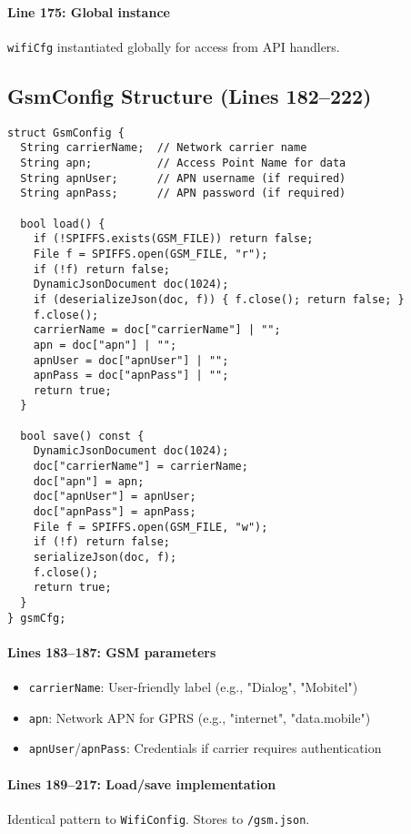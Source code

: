 \documentclass[11pt,a4paper]{article}
\begin{document}
\paragraph{Line 175: Global instance}
\texttt{wifiCfg} instantiated globally for access from API handlers.

\subsection{GsmConfig Structure (Lines 182--222)}

\begin{verbatim}
struct GsmConfig {
  String carrierName;  // Network carrier name
  String apn;          // Access Point Name for data
  String apnUser;      // APN username (if required)
  String apnPass;      // APN password (if required)

  bool load() {
    if (!SPIFFS.exists(GSM_FILE)) return false;
    File f = SPIFFS.open(GSM_FILE, "r");
    if (!f) return false;
    DynamicJsonDocument doc(1024);
    if (deserializeJson(doc, f)) { f.close(); return false; }
    f.close();
    carrierName = doc["carrierName"] | "";
    apn = doc["apn"] | "";
    apnUser = doc["apnUser"] | "";
    apnPass = doc["apnPass"] | "";
    return true;
  }

  bool save() const {
    DynamicJsonDocument doc(1024);
    doc["carrierName"] = carrierName;
    doc["apn"] = apn;
    doc["apnUser"] = apnUser;
    doc["apnPass"] = apnPass;
    File f = SPIFFS.open(GSM_FILE, "w");
    if (!f) return false;
    serializeJson(doc, f);
    f.close();
    return true;
  }
} gsmCfg;
\end{verbatim}

\paragraph{Lines 183--187: GSM parameters}
\begin{itemize}[leftmargin=*]
  \item \texttt{carrierName}: User-friendly label (e.g., "Dialog", "Mobitel")
  \item \texttt{apn}: Network APN for GPRS (e.g., "internet", "data.mobile")
  \item \texttt{apnUser}/\texttt{apnPass}: Credentials if carrier requires authentication
\end{itemize}

\paragraph{Lines 189--217: Load/save implementation}
Identical pattern to \texttt{WifiConfig}. Stores to \texttt{/gsm.json}.
\end{document}
